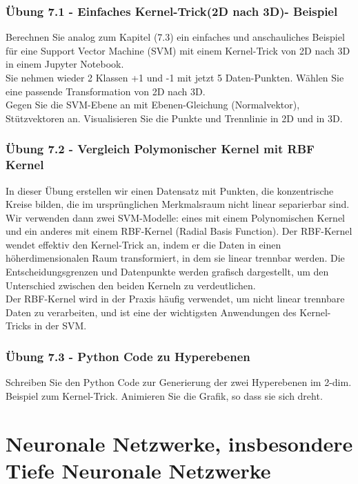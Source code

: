 \documentclass[12pt]{article}
\begin{document}
\subsubsection{Übung 7.1 - Einfaches Kernel-Trick(2D nach 3D)- Beispiel}
%
Berechnen Sie analog zum Kapitel (7.3) ein einfaches und anschauliches Beispiel für eine Support Vector Machine (SVM) mit einem Kernel-Trick von 2D nach 3D in einem Jupyter Notebook.\\
Sie nehmen wieder 2 Klassen +1 und -1 mit jetzt 5 Daten-Punkten. Wählen Sie eine passende Transformation von 2D nach 3D.\\
Gegen Sie die SVM-Ebene an mit Ebenen-Gleichung (Normalvektor), Stützvektoren an. Visualisieren Sie die Punkte und Trennlinie in 2D und in 3D. 

\subsubsection{Übung 7.2 - Vergleich Polymonischer Kernel mit RBF Kernel}
%
In dieser Übung erstellen wir einen Datensatz mit Punkten, die konzentrische Kreise bilden, die im ursprünglichen Merkmalsraum nicht linear separierbar sind. Wir verwenden dann zwei SVM-Modelle: eines mit einem Polynomischen Kernel und ein anderes mit einem RBF-Kernel (Radial Basis Function). Der RBF-Kernel wendet effektiv den Kernel-Trick an, indem er die Daten in einen höherdimensionalen Raum transformiert, in dem sie linear trennbar werden. Die Entscheidungsgrenzen und Datenpunkte werden grafisch dargestellt, um den Unterschied zwischen den beiden Kerneln zu verdeutlichen.\\
Der RBF-Kernel wird in der Praxis häufig verwendet, um nicht linear trennbare Daten zu verarbeiten, und ist eine der wichtigsten Anwendungen des Kernel-Tricks in der SVM.
%
\subsubsection{Übung 7.3 - Python Code zu Hyperebenen}
Schreiben Sie den Python Code zur Generierung der zwei Hyperebenen im 2-dim. Beispiel zum Kernel-Trick. Animieren Sie die Grafik, so dass sie sich dreht. 

\newpage

\section{Neuronale Netzwerke, insbesondere Tiefe Neuronale Netzwerke }
\end{document}
